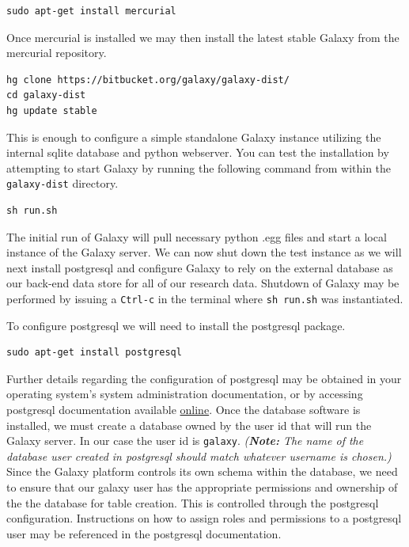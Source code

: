 \documentclass[a4paper,10pt]{article}
\begin{document}
\begin{lstlisting}
sudo apt-get install mercurial
\end{lstlisting}

Once mercurial is installed we may then install the latest stable Galaxy from the mercurial repository.

\begin{lstlisting}
hg clone https://bitbucket.org/galaxy/galaxy-dist/
cd galaxy-dist
hg update stable
\end{lstlisting}

This is enough to configure a simple standalone Galaxy instance utilizing the internal sqlite database and python webserver.  You can test the installation by attempting to start Galaxy by running the following command from within the \texttt{\footnotesize{galaxy-dist}} directory.

\begin{lstlisting}
sh run.sh
\end{lstlisting}

The initial run of Galaxy will pull necessary python .egg files and start a local instance of the Galaxy server.  We can now shut down the test instance as we will next install postgresql and configure Galaxy to rely on the external database as our back-end data store for all of our research data.  Shutdown of Galaxy may be performed by issuing a \texttt{\footnotesize{Ctrl-c}} in the terminal where \texttt{\footnotesize{sh run.sh}} was instantiated.

To configure postgresql we will need to install the postgresql package.

\begin{lstlisting}
sudo apt-get install postgresql
\end{lstlisting}

Further details regarding the configuration of postgresql may be obtained in your operating system's system administration documentation, or by accessing postgresql documentation available \href{http://www.postgresql.org/}{online}.  Once the database software is installed, we must create a database owned by the user id that will run the Galaxy server.  In our case the user id is \texttt{\footnotesize{galaxy}}.  \textit{(\textbf{Note:} The name of the database user created in postgresql should match whatever username is chosen.)}  Since the Galaxy platform controls its own schema within the database, we need to ensure that our galaxy user has the appropriate permissions and ownership of the the database for table creation.  This is controlled through the postgresql configuration.  Instructions on how to assign roles and permissions to a postgresql user may be referenced in the postgresql documentation.
\end{document}
